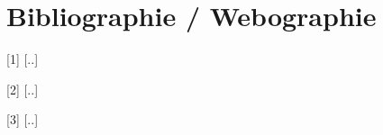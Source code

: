 \chapter{Bibliographie / Webographie}
\begin{description}
\item{[1]} [..]
\item{[2]} [..]
\item{[3]} [..]
\end{description} 